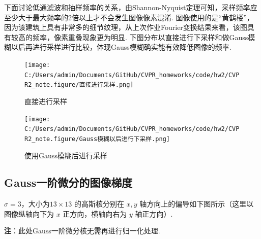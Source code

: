 \documentclass[12pt, a4paper, oneside]{ctexart}
\numberwithin{equation}{section}  %
\begin{document}
\begin{figure}[htbp]
    \centering
\end{figure}

下面讨论低通滤波和抽样频率的关系，由Shannon-Nyquist定理可知，采样频率应至少大于最大频率的2倍以上才不会发生图像像素混淆.
图像使用的是“黄鹤楼”，因为该建筑上具有非常多的细节纹理，从上次作业Fourier变换结果来看，该图具有较高的频率，像素重叠现象更为明显.
下图分布以直接进行下采样和做Gauss模糊以后再进行采样进行比较，体现Gauss模糊确实能有效降低图像的频率.

\begin{figure}[htbp]
    \centering
    \hspace*{-1.5cm}
    \texttt{[image: C:/Users/admin/Documents/GitHub/CVPR\_homeworks/code/hw2/CVPR2\_note.figure/直接进行采样.png]}
    \caption{直接进行采样\label{fig-4}}
\end{figure}

\begin{figure}[htbp]
    \centering
    \hspace*{-1.5cm}
    \texttt{[image: C:/Users/admin/Documents/GitHub/CVPR\_homeworks/code/hw2/CVPR2\_note.figure/Gauss模糊以后进行下采样.png]}
    \caption{使用Gauss模糊后进行采样\label{fig-5}}
\end{figure}

\clearpage
\subsection{Gauss一阶微分的图像梯度}
\(\sigma = 3\)，大小为\(13\times 13\) 的高斯核分别在 \(x,y\)
轴方向上的偏导如下图所示（这里以图像纵轴向下为 \(x\) 正方向，横轴向右为
\(y\) 轴正方向）.

\textbf{注}：此处Gauss一阶微分核无需再进行归一化处理.
\end{document}
